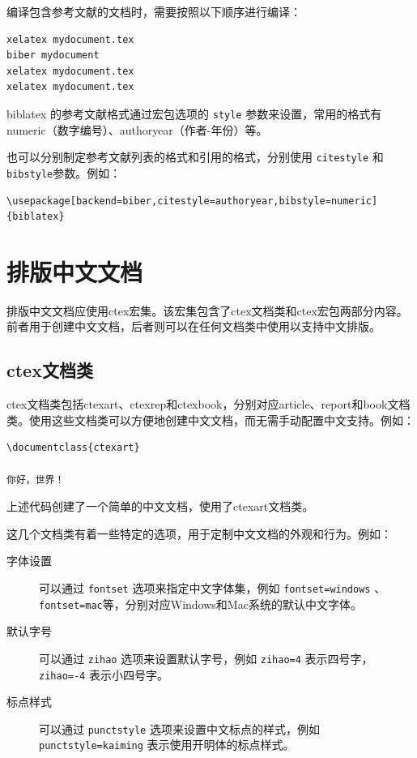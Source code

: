 编译包含参考文献的文档时，需要按照以下顺序进行编译：
\begin{verbatim}
xelatex mydocument.tex
biber mydocument
xelatex mydocument.tex
xelatex mydocument.tex
\end{verbatim}

biblatex 的参考文献格式通过宏包选项的 \verb|style| 参数来设置，常用的格式有numeric（数字编号）、authoryear（作者-年份）等。

也可以分别制定参考文献列表的格式和引用的格式，分别使用 \verb|citestyle| 和\verb|bibstyle|参数。例如：
\begin{verbatim}
\usepackage[backend=biber,citestyle=authoryear,bibstyle=numeric]{biblatex}
\end{verbatim}

\section{排版中文文档}

排版中文文档应使用ctex宏集。该宏集包含了ctex文档类和ctex宏包两部分内容。前者用于创建中文文档，后者则可以在任何文档类中使用以支持中文排版。

\subsection{ctex文档类}

ctex文档类包括ctexart、ctexrep和ctexbook，分别对应article、report和book文档类。使用这些文档类可以方便地创建中文文档，而无需手动配置中文支持。例如：
\begin{verbatim}
\documentclass{ctexart}

你好，世界！

\end{verbatim}

上述代码创建了一个简单的中文文档，使用了ctexart文档类。

这几个文档类有着一些特定的选项，用于定制中文文档的外观和行为。例如：
\begin{description}
  \item[字体设置] 可以通过 \verb|fontset| 选项来指定中文字体集，例如 \verb|fontset=windows| 、\verb|fontset=mac|等，分别对应Windows和Mac系统的默认中文字体。
  \item[默认字号] 可以通过 \verb|zihao| 选项来设置默认字号，例如 \verb|zihao=4| 表示四号字， \verb|zihao=-4| 表示小四号字。
  \item[标点样式] 可以通过 \verb|punctstyle| 选项来设置中文标点的样式，例如 \verb|punctstyle=kaiming| 表示使用开明体的标点样式。
\end{description}


